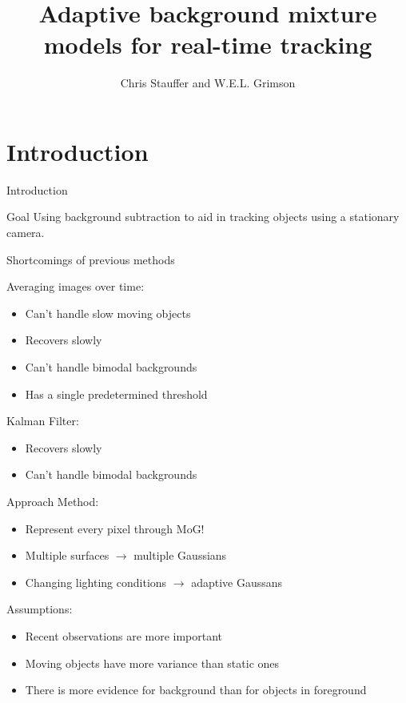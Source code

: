 \documentclass{beamer}
\title[Adaptive background mixture models for real-time tracking]
{Adaptive background mixture models for real-time tracking}
\author[Chiel Kooijman, Auke Wiggers] %
{Chris Stauffer and W.E.L. Grimson}
\institute[University of Amsterdam] %
{
  Chiel Kooijman and Auke Wiggers \\
  Computer Vision  \\
  Artificial Intelligence \\
  Faculty of Science (FNWI) \\
  University of Amsterdam
}
\begin{document}
\maketitle

\section{Introduction}
\begin{frame}{Introduction}
\begin{block}{Goal}
Using background subtraction to aid in tracking objects using a stationary camera.
\end{block}

\end{frame}

\begin{frame}{Shortcomings of previous methods}

Averaging images over time:
\begin{itemize}
\item Can't handle slow moving objects
\item Recovers slowly
\item Can't handle bimodal backgrounds
\item Has a single predetermined threshold
\end{itemize}

Kalman Filter:
\begin{itemize}
\item Recovers slowly
\item Can't handle bimodal backgrounds
\end{itemize}
\end{frame}

\begin{frame}{Approach}
Method:
\begin{itemize}
\item Represent every pixel through MoG!
\item Multiple surfaces $\rightarrow$ multiple Gaussians
\item Changing lighting conditions $\rightarrow$ adaptive Gaussans
\end{itemize}

Assumptions:
\begin{itemize}
\item Recent observations are more important
\item Moving objects have more variance than static ones
\item There is more evidence for background than for objects in foreground
\end{itemize}

\end{frame}
\end{document}
